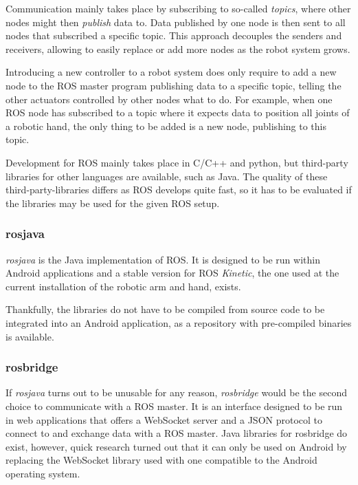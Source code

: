 \documentclass[a4paper]{article}
\begin{document}
Communication mainly takes place by subscribing to so-called \textit{topics}, where other nodes might then \textit{publish} data to. Data published by one node is then sent to all nodes that subscribed a specific topic. This approach decouples the senders and receivers, allowing to easily replace or add more nodes as the robot system grows.

Introducing a new controller to a robot system does only require to add a new node to the ROS master program publishing data to a specific topic, telling the other actuators controlled by other nodes what to do. For example, when one ROS node has subscribed to a topic where it expects data to position all joints of a robotic hand, the only thing to be added is a new node, publishing to this topic.

Development for ROS mainly takes place in C/C++ and python, but third-party libraries for other languages are available, such as Java. The quality of these third-party-libraries differs as ROS develops quite fast, so it has to be evaluated if the libraries may be used for the given ROS setup.

\subsubsection{rosjava}

\textit{rosjava} is the Java implementation of ROS. It is designed to be run within Android applications and a stable version for ROS \textit{Kinetic}, the one used at the current installation of the robotic arm and hand, exists. 

Thankfully, the libraries do not have to be compiled from source code to be integrated into an Android application, as a repository with pre-compiled binaries is available.

\subsubsection{rosbridge}

If \textit{rosjava} turns out to be unusable for any reason, \textit{rosbridge} would be the second choice to communicate with a ROS master. It is an interface designed to be run in web applications that offers a WebSocket server and a JSON protocol to connect to and exchange data with a ROS master. Java libraries for rosbridge do exist, however, quick research turned out that it can only be used on Android by replacing the WebSocket library used with one compatible to the Android operating system.
\end{document}
